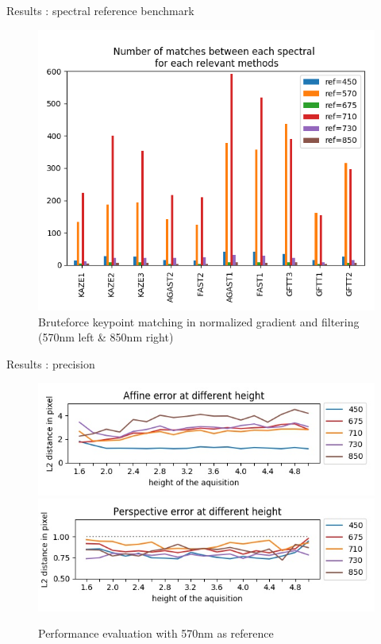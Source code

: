\documentclass{beamer}
\begin{document}
		\begin{frame}{Results : spectral reference benchmark}
			\begin{figure}
				\includegraphics[width=0.8\linewidth]{../figures/comparaison-keypoint-matching-reference-merged.png}
				\caption{Bruteforce keypoint matching in normalized gradient and filtering (570nm left \& 850nm right)}
			\end{figure}
		\end{frame}
	
		\begin{frame}{Results : precision}
			\begin{figure}
				\includegraphics[width=0.8\linewidth]{../figures/affine-allignement-rmse.jpg} \\
				\includegraphics[width=0.8\linewidth]{../figures/prespective-allignement-rmse.jpg}
				\caption{Performance evaluation with 570nm as reference}
			\end{figure}
		\end{frame}
	
\end{document}
